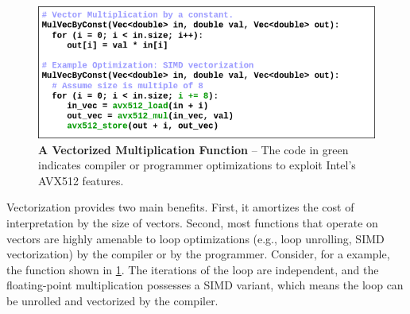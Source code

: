 \documentclass[12pt]{cmuthesis}
\begin{document}
\begin{figure}[t!]
    \centering
    \includegraphics[scale=0.5]{images/VectorMul.png}
    \caption{\textbf{A Vectorized Multiplication Function} -- The code in green indicates compiler or programmer optimizations to exploit Intel's AVX512 features.}
    \label{fig:vector_mul}
\end{figure}
Vectorization provides two main benefits. First, it amortizes the cost of interpretation by the size of vectors. Second, most functions that operate on vectors are highly amenable to loop optimizations (e.g., loop unrolling, SIMD vectorization) by the compiler or by the programmer. Consider, for a example, the function shown in \cref{fig:vector_mul}. The iterations of the loop are independent, and the floating-point multiplication possesses a SIMD variant, which means the loop can be unrolled and vectorized by the compiler.

\end{document}
